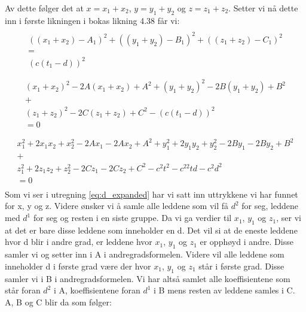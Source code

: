 Av dette følger det at $x=x_1+x_2$, $y=y_1+y_2$ og $z=z_1+z_2$. Setter vi nå dette inn i første likningen i bokas likning 4.38 får vi: 
\begin{multline}
	\\
    ((x_1+x_2)-A_1)^2+((y_1+y_2)-B_1)^2+((z_1+z_2)-C_1)^2\\
    =\\
    (c(t_1-d))^2 \\\nonumber
\end{multline}
\begin{multline}
	\\
  (x_1+x_2)^2-2A(x_1+x_2)+A^2+(y_1+y_2)^2-2B(y_1+y_2)+B^2\\
    +\\
    (z_1+z_2)^2-2C(z_1+z_2)+C^2-(c(t_1-d))^2\\
    =0 \nonumber 	\\
\end{multline}
\begin{multline}\label{eq:d_expanded}
    \\
    x_1^2+2x_1x_2+x_2^2-2Ax_1-2Ax_2+A^2+y_1^2+2y_1y_2+y_2^2-2By_1-2By_2+B^2\\
    +\\
    z_1^2+2z_1z_2+z_2^2-2Cz_1-2Cz_2+C^2-c^2t^2-c^22td-c^2d^2 \\
    = 0\\
\end{multline}
Som vi ser i utregning \ref{eq:d_expanded} har vi satt inn uttrykkene vi har funnet for x, y og z. Videre ønsker vi å samle alle leddene som vil få $d^2$ for seg, leddene med $d^1$ for seg og resten i en siste gruppe. Da vi ga verdier til $x_1$, $y_1$ og $z_1$, ser vi at det er bare disse leddene som inneholder en d. Det vil si at de eneste leddene hvor d blir i andre grad, er leddene hvor $x_1$, $y_1$ og $z_1$ er opphøyd i andre. Disse samler vi og setter inn i A i andregradsformelen. Videre vil alle leddene som inneholder d i første grad være der hvor $x_1$, $y_1$ og $z_1$ står i første grad. Disse samler vi i B i andregradsformelen. Vi har altså samlet alle koeffisientene som står foran $d^2$ i A, koeffisientene foran $d^1$ i B mens resten av leddene samles i C. A, B og C blir da som følger: 

